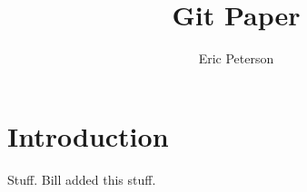 \documentclass[12pt]{article}
\author{Eric Peterson} \title{Git Paper}
\begin{document}
\maketitle
\section{Introduction}

Stuff.
Bill added this stuff.
\end{document}
